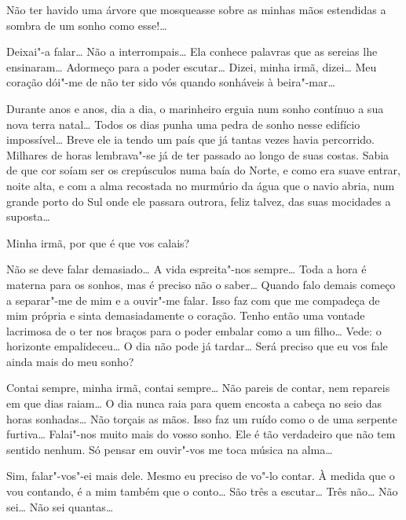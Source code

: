  Não ter havido uma árvore que
mosqueasse sobre as minhas mãos
estendidas a sombra de um sonho como esse!\ldots{}

 Deixai"-a falar\ldots{}
Não a interrompais\ldots{} Ela conhece
palavras que as sereias lhe ensinaram\ldots{} Adormeço para a poder
escutar\ldots{} Dizei, minha irmã, dizei\ldots{}
Meu coração dói"-me de não ter
sido vós quando sonháveis à beira"-mar\ldots{}

 Durante anos e anos, dia a dia,
o marinheiro erguia num sonho
contínuo a sua nova terra natal\ldots{} 
Todos os dias punha uma pedra de
sonho nesse edifício impossível\ldots{}
Breve ele ia tendo um país que já
tantas vezes havia percorrido. Milhares
de horas lembrava"-se já de
ter passado ao longo de suas costas. Sabia de que cor soíam ser os
crepúsculos numa baía do Norte, e como era
suave entrar, noite alta, e
com a alma recostada no murmúrio da água que
o navio abria, num grande
porto do Sul onde ele passara outrora,
feliz talvez, das suas mocidades
a suposta\ldots{}

\hfill{} 

 Minha irmã, por que é que vos calais?

 Não se deve falar demasiado\ldots{} 
A vida espreita"-nos sempre\ldots{}
Toda a hora é materna para os sonhos, mas é preciso
não o saber\ldots{}
Quando falo demais começo a separar"-me de mim 
e a ouvir"-me falar.
Isso faz com que me compadeça de mim própria e 
sinta demasiadamente o coração. Tenho então uma
vontade lacrimosa de o ter nos braços para o
poder embalar como a um filho\ldots{} Vede:
o horizonte empalideceu\ldots{} O dia
não pode já tardar\ldots{} Será preciso que eu
vos fale ainda mais do meu sonho?

 Contai sempre, minha irmã, contai sempre\ldots{} 
Não pareis de contar, nem repareis em que dias raiam\ldots{}
O dia nunca raia para quem encosta a cabeça no seio 
das horas sonhadas\ldots{} Não torçais as mãos.
Isso faz um ruído como o de uma serpente furtiva\ldots{} 
Falai"-nos muito mais do vosso sonho.
Ele é tão verdadeiro que não tem sentido nenhum.
Só pensar em ouvir"-vos me toca música na alma\ldots{}

 Sim, falar"-vos"-ei mais dele. 
Mesmo eu preciso de vo"-lo
contar. À medida que o vou contando,
é a mim também que o conto\ldots{} São
três a escutar\ldots{}  
Três não\ldots{} Não sei\ldots{} Não sei quantas\ldots{} 


